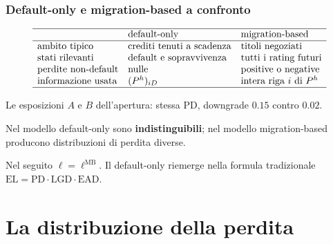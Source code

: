 \begin{frame}%
%

\frametitle{Default-only e migration-based a confronto}%
%

%


\[
\begin{array}
[c]{lll}\hline
& \text{default-only} & \text{migration-based}\\\hline
\text{ambito tipico} & \text{crediti tenuti a scadenza} & \text{titoli
negoziati}\\
\text{stati rilevanti} & \text{default e sopravvivenza} & \text{tutti i rating
futuri}\\
\text{perdite non-default} & \text{nulle} & \text{positive o negative}\\
\text{informazione usata} & (P^{h})_{iD} & \text{intera riga $i$ di }P^{h}\\
\hline
\end{array}
\]

\medskip

\begin{stepitemize}
\item Le esposizioni $A$ e $B$ dell'apertura: stessa $\mathrm{PD}$, downgrade
$0.15$ contro $0.02$.

\item Nel modello default-only sono \textbf{indistinguibili}; nel modello
migration-based producono distribuzioni di perdita diverse.

\item Nel seguito $\ell=\ell^{\mathrm{MB}}$. Il default-only riemerge nella
formula tradizionale $\mathrm{EL}=\mathrm{PD}\cdot\mathrm{LGD}\cdot\mathrm{EAD}$.
\end{stepitemize}

\transboxout
\end{frame}%



\section{La distribuzione della perdita}


